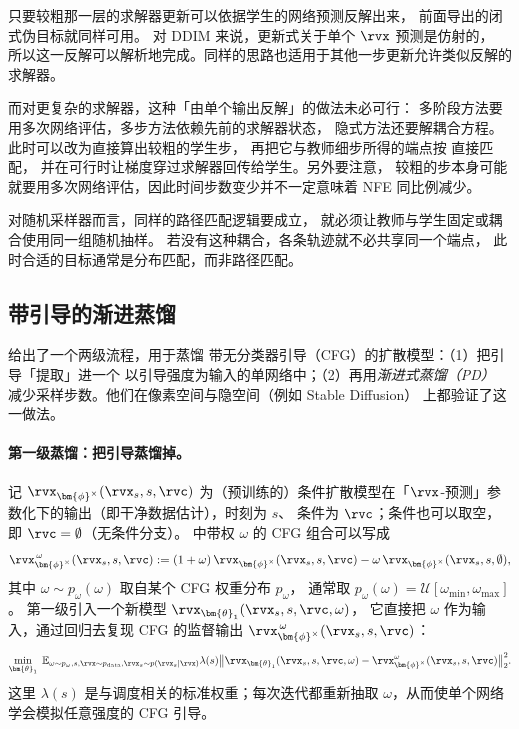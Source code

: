 只要较粗那一层的求解器更新可以依据学生的网络预测反解出来，
前面导出的闭式伪目标就同样可用。
对 DDIM 来说，更新式关于单个 $\rvx$ 预测是仿射的，
所以这一反解可以解析地完成。同样的思路也适用于其他一步更新允许类似反解的求解器。

而对更复杂的求解器，这种「由单个输出反解」的做法未必可行：
多阶段方法要用多次网络评估，多步方法依赖先前的求解器状态，
隐式方法还要解耦合方程。此时可以改为直接算出较粗的学生步，
再把它与教师细步所得的端点按  直接匹配，
并在可行时让梯度穿过求解器回传给学生。另外要注意，
较粗的步本身可能就要用多次网络评估，因此时间步数变少并不一定意味着 NFE 同比例减少。

对随机采样器而言，同样的路径匹配逻辑要成立，
就必须让教师与学生固定或耦合使用同一组随机抽样。
若没有这种耦合，各条轨迹就不必共享同一个端点，
此时合适的目标通常是分布匹配，而非路径匹配。


\subsection{带引导的渐进蒸馏}\label{subsec:pd-guidance}
\citet{meng2023distillation} 给出了一个两级流程，用于蒸馏
带无分类器引导（CFG）的扩散模型：（1）把引导「提取」进一个
以引导强度为输入的单网络中；（2）再用\emph{渐进式蒸馏（PD）}
减少采样步数。他们在像素空间与隐空间（例如 Stable Diffusion）
上都验证了这一做法。

\paragraph{第一级蒸馏：把引导蒸馏掉。}
记 $\rvx_{\bm{\phi}^\times}(\rvx_s, s, \rvc)$ 为（预训练的）条件扩散模型在「$\rvx$-预测」参数化下的输出（即干净数据估计），时刻为 $s$、
条件为 $\rvc$；条件也可以取空，即 $\rvc=\emptyset$（无条件分支）。
 中带权 $\omega$ 的 CFG 组合可以写成
\begin{equation}\label{eq:cfg-model-clean}
   \rvx_{\bm{\phi}^\times}^{\,\omega}(\rvx_s, s, \rvc)
   := (1+\omega)\,\rvx_{\bm{\phi}^\times}(\rvx_s, s, \rvc)
      - \omega\,\rvx_{\bm{\phi}^\times}(\rvx_s, s, \emptyset),
\end{equation}
其中 $\omega \sim p_\omega(\omega)$ 取自某个 CFG 权重分布 $p_\omega$，
通常取 $p_\omega(\omega)=\mathcal{U}[\omega_{\min},\omega_{\max}]$。
第一级引入一个新模型 $\rvx_{\bm{\theta}_1}(\rvx_s, s, \rvc, \omega)$，
它直接把 $\omega$ 作为输入，通过回归去复现 CFG 的监督输出
$\rvx_{\bm{\phi}^\times}^{\,\omega}(\rvx_s, s, \rvc)$：
\[
\min_{\bm{\theta}_1}\;
\mathbb{E}_{\omega\sim p_\omega, s, \rvx\sim p_{\mathrm{data}}, \rvx_s \sim p(\rvx_s\mid \rvx)}
\lambda(s)
\big\|\rvx_{\bm{\theta}_1}(\rvx_s, s, \rvc, \omega)-\rvx_{\bm{\phi}^\times}^{\omega}(\rvx_s, s, \rvc)\big\|_2^2.
\]
这里 $\lambda(s)$ 是与调度相关的标准权重；每次迭代都重新抽取
$\omega$，从而使单个网络学会模拟任意强度的 CFG 引导。

